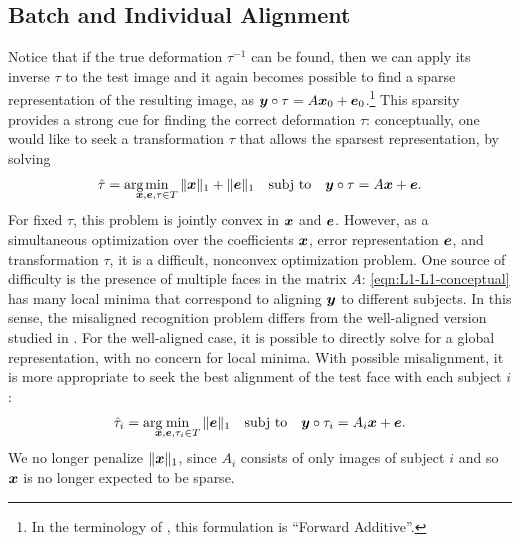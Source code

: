 \documentclass[12pt,journal,draftcls,letterpaper,onecolumn]{IEEEtran}
\newcommand{\subj}{\textup{subj to}}
\begin{document}
\subsection{Batch and Individual Alignment} Notice that if the
true deformation $\tau^{-1}$ can be found, then we can apply
its inverse $\tau$ to the test image and it again becomes
possible to find a sparse representation of the resulting
image, as ${\boldsymbol{y}} \circ \tau = A {\boldsymbol{x}}_0 + \boldsymbol{e}_0$.\footnote{In the terminology of \cite{baker2004lucas}, this formulation is ``Forward Additive''.}
  This sparsity
provides a strong cue for finding the correct deformation
$\tau$: conceptually, one would like to seek a transformation
$\tau$ that allows the sparsest representation, by solving
\begin{equation} \label{eqn:L1-L1-conceptual}
\hat{\tau} = \arg\hspace{-2.5mm}\min_{\x,\e,\tau \in T} \| \x \|_1 + \| \e \|_1 \quad \subj \quad \y \circ \tau = A \x + \e.
\end{equation}
For fixed $\tau$, this problem is jointly convex in ${\boldsymbol{x}}$ and
$\boldsymbol{e}$. However, as a simultaneous optimization over the
coefficients ${\boldsymbol{x}}$, error representation $\boldsymbol{e}$, and
transformation $\tau$, it is a difficult, nonconvex
optimization problem. One source of difficulty is the presence
of multiple faces in the matrix $A$:
\eqref{eqn:L1-L1-conceptual} has many local minima that
correspond to aligning ${\boldsymbol{y}}$ to different subjects. In this
sense, the misaligned recognition problem differs from the
well-aligned version studied in \cite{Wright2009-PAMI}. For the
well-aligned case, it is possible to directly solve for a
global representation, with no concern for local minima. With
possible misalignment, it is more appropriate to seek the best
alignment of the test face with each subject $i$:
\begin{equation} \label{eqn:per-subject-L1}
\hat \tau_i = \arg\hspace{-2.5mm}\min_{\x,\e,\tau_i \in T} \| \e \|_1 \quad \subj \quad \y \circ \tau_i = A_i \x + \e.
\end{equation}
We no longer penalize $\| {\boldsymbol{x}} \|_1$, since $A_i$ consists of
only images of subject $i$ and so ${\boldsymbol{x}}$ is no longer expected to
be sparse.
\end{document}
